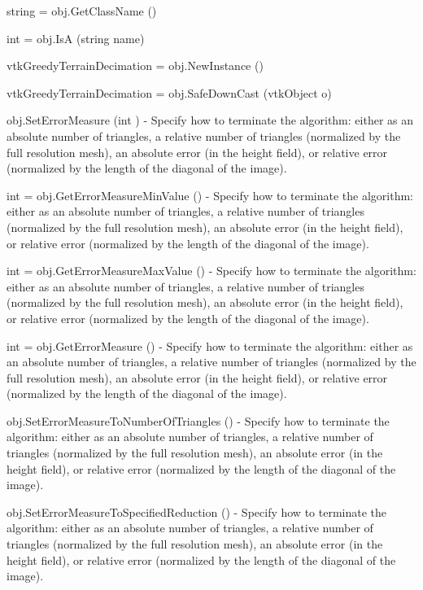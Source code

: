 \begin{DoxyItemize}
\item {\ttfamily string = obj.\-Get\-Class\-Name ()}  
\item {\ttfamily int = obj.\-Is\-A (string name)}  
\item {\ttfamily vtk\-Greedy\-Terrain\-Decimation = obj.\-New\-Instance ()}  
\item {\ttfamily vtk\-Greedy\-Terrain\-Decimation = obj.\-Safe\-Down\-Cast (vtk\-Object o)}  
\item {\ttfamily obj.\-Set\-Error\-Measure (int )} -\/ Specify how to terminate the algorithm\-: either as an absolute number of triangles, a relative number of triangles (normalized by the full resolution mesh), an absolute error (in the height field), or relative error (normalized by the length of the diagonal of the image).  
\item {\ttfamily int = obj.\-Get\-Error\-Measure\-Min\-Value ()} -\/ Specify how to terminate the algorithm\-: either as an absolute number of triangles, a relative number of triangles (normalized by the full resolution mesh), an absolute error (in the height field), or relative error (normalized by the length of the diagonal of the image).  
\item {\ttfamily int = obj.\-Get\-Error\-Measure\-Max\-Value ()} -\/ Specify how to terminate the algorithm\-: either as an absolute number of triangles, a relative number of triangles (normalized by the full resolution mesh), an absolute error (in the height field), or relative error (normalized by the length of the diagonal of the image).  
\item {\ttfamily int = obj.\-Get\-Error\-Measure ()} -\/ Specify how to terminate the algorithm\-: either as an absolute number of triangles, a relative number of triangles (normalized by the full resolution mesh), an absolute error (in the height field), or relative error (normalized by the length of the diagonal of the image).  
\item {\ttfamily obj.\-Set\-Error\-Measure\-To\-Number\-Of\-Triangles ()} -\/ Specify how to terminate the algorithm\-: either as an absolute number of triangles, a relative number of triangles (normalized by the full resolution mesh), an absolute error (in the height field), or relative error (normalized by the length of the diagonal of the image).  
\item {\ttfamily obj.\-Set\-Error\-Measure\-To\-Specified\-Reduction ()} -\/ Specify how to terminate the algorithm\-: either as an absolute number of triangles, a relative number of triangles (normalized by the full resolution mesh), an absolute error (in the height field), or relative error (normalized by the length of the diagonal of the image).  

\end{DoxyItemize}
